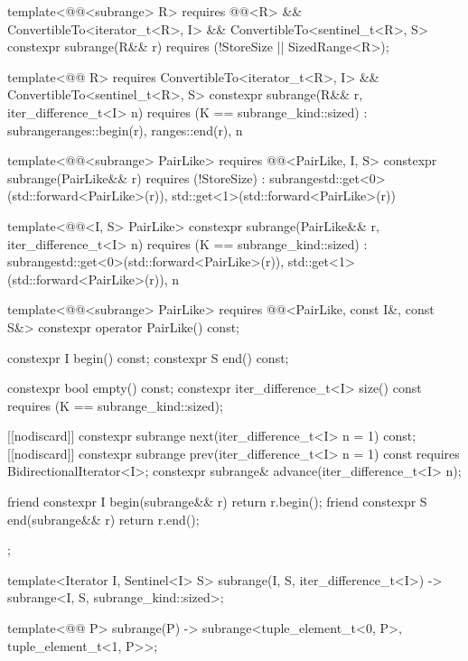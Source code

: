 \begin{codeblock}
{{    template<@@<subrange> R>
      requires @@<R> &&
        ConvertibleTo<iterator_t<R>, I> && ConvertibleTo<sentinel_t<R>, S>
    constexpr subrange(R&& r) requires (!StoreSize || SizedRange<R>);

    template<@@ R>
      requires ConvertibleTo<iterator_t<R>, I> && ConvertibleTo<sentinel_t<R>, S>
    constexpr subrange(R&& r, iter_difference_t<I> n)
      requires (K == subrange_kind::sized)
        : subrange{ranges::begin(r), ranges::end(r), n}
    {}

    template<@@<subrange> PairLike>
      requires @@<PairLike, I, S>
    constexpr subrange(PairLike&& r) requires (!StoreSize)
      : subrange{std::get<0>(std::forward<PairLike>(r)),
                 std::get<1>(std::forward<PairLike>(r))}
    {}

    template<@@<I, S> PairLike>
    constexpr subrange(PairLike&& r, iter_difference_t<I> n)
      requires (K == subrange_kind::sized)
      : subrange{std::get<0>(std::forward<PairLike>(r)),
                 std::get<1>(std::forward<PairLike>(r)), n}
    {}

    template<@@<subrange> PairLike>
      requires @@<PairLike, const I&, const S&>
    constexpr operator PairLike() const;

    constexpr I begin() const;
    constexpr S end() const;

    constexpr bool empty() const;
    constexpr iter_difference_t<I> size() const
      requires (K == subrange_kind::sized);

    [[nodiscard]] constexpr subrange next(iter_difference_t<I> n = 1) const;
    [[nodiscard]] constexpr subrange prev(iter_difference_t<I> n = 1) const
      requires BidirectionalIterator<I>;
    constexpr subrange& advance(iter_difference_t<I> n);

    friend constexpr I begin(subrange&& r) { return r.begin(); }
    friend constexpr S end(subrange&& r) { return r.end(); }
  };

  template<Iterator I, Sentinel<I> S>
    subrange(I, S, iter_difference_t<I>) -> subrange<I, S, subrange_kind::sized>;

  template<@@ P>
    subrange(P) -> subrange<tuple_element_t<0, P>, tuple_element_t<1, P>>;

}
\end{codeblock}
